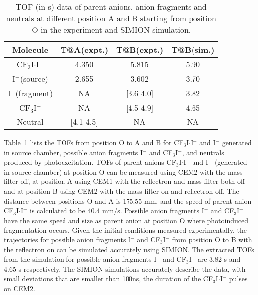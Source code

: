 \documentclass[%
aip,
rsi,
 amsmath,amssymb,
reprint,%
]{revtex4-1}
\begin{document}
\begin{table} 
\caption{\label{tab:table} TOF (in {\textmu}s) data of parent anions, anion fragments and neutrals at different position A and B starting from position O in the experiment and SIMION simulation.}
\begin{ruledtabular}
\begin{tabular}{cccc}
\mbox{Molecule}&\mbox{T@A(expt.)}&\mbox{T@B(expt.)}&\mbox{T@B(sim.)}\\
\hline
\mbox{CF$_3$I$\cdot$I$^-$}&\mbox{4.350}&\mbox{5.815}&\mbox{5.90}\\
I$^-$(source)& 2.655 & 3.602 & 3.70 \\
I$^-$(fragment)& NA\footnotemark[1] & [3.6  4.0] & 3.82 \\
CF$_3$I$^-$& NA\footnotemark[1] & [4.5  4.9] & 4.65 \\
Neutral&[4.1 4.5]&NA\footnotemark[2]&NA\footnotemark[2] \\
\end{tabular}
\end{ruledtabular}
\end{table}

Table~\ref{tab:table} lists the TOFs from position O to A and B for CF$_3$I$\cdot$I$^-$ and I$^-$ generated in source chamber, possible anion fragments I$^-$ and CF$_3$I$^-$, and neutrals produced by photoexcitation. TOFs of parent anions CF$_3$I$\cdot$I$^-$ and I$^-$ (generated in source chamber) at position O can be measured using CEM2 with the mass filter off, at position A using CEM1 with the reflectron and mass filter both off and at position B using CEM2 with the mass filter on and reflectron off. The distance between positions O and A is 175.55 mm, and the speed of parent anion CF$_3$I$\cdot$I$^-$ is calculated to be 40.4 mm/{\textmu}s. Possible anion fragments I$^-$ and CF$_3$I$^-$ have the same speed and size as parent anion at position O where photoinduced fragmentation occurs. Given the initial conditions measured experimentally, the trajectories for possible anion fragments I$^-$ and CF$_3$I$^-$ from position O to B with the reflectron on can be simulated accurately using SIMION. The extracted TOFs from the simulation for possible anion fragments I$^-$ and CF$_3$I$^-$ are 3.82 {\textmu}s and 4.65 {\textmu}s respectively. The SIMION simulations accurately describe the data, with small deviations that are smaller than 100ns, the duration of the CF$_3$I$\cdot$I$^-$ pulses on CEM2. 
\end{document}

